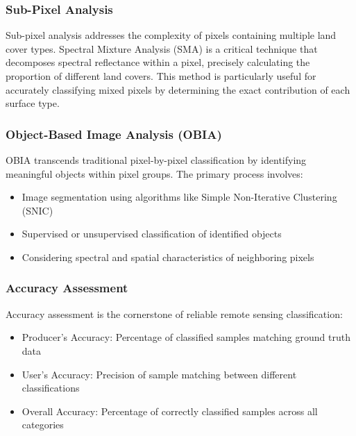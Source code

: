 \documentclass[
  letterpaper,
]{scrbook}
\begin{document}
\subsubsection{Sub-Pixel Analysis}\label{sub-pixel-analysis}

Sub-pixel analysis addresses the complexity of pixels containing
multiple land cover types. Spectral Mixture Analysis (SMA) is a critical
technique that decomposes spectral reflectance within a pixel, precisely
calculating the proportion of different land covers. This method is
particularly useful for accurately classifying mixed pixels by
determining the exact contribution of each surface type.

\subsubsection{Object-Based Image Analysis
(OBIA)}\label{object-based-image-analysis-obia}

OBIA transcends traditional pixel-by-pixel classification by identifying
meaningful objects within pixel groups. The primary process involves:

\begin{itemize}
\item
  Image segmentation using algorithms like Simple Non-Iterative
  Clustering (SNIC)
\item
  Supervised or unsupervised classification of identified objects
\item
  Considering spectral and spatial characteristics of neighboring pixels
\end{itemize}

\subsubsection{Accuracy Assessment}\label{accuracy-assessment-1}

Accuracy assessment is the cornerstone of reliable remote sensing
classification:

\begin{itemize}
\item
  Producer's Accuracy: Percentage of classified samples matching ground
  truth data
\item
  User's Accuracy: Precision of sample matching between different
  classifications
\item
  Overall Accuracy: Percentage of correctly classified samples across
  all categories
\end{itemize}
\end{document}
